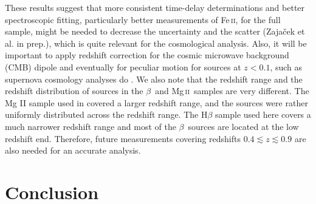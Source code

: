 \documentclass[a4paper,fleqn,usenatbib]{mnras}
\newcommand{\Feii}{Fe\,\textsc{ii}}
\newcommand{\Mgii}{Mg\,\textsc{ii}}
\newcommand{\hb}{{\sc{H}}$\beta$\/}
\begin{document}
These results suggest  that more consistent time-delay determinations and better spectroscopic fitting, particularly better measurements of \Feii, for the full sample, might be needed to decrease the uncertainty and the scatter (Zaja\v{c}ek et al. in prep.), which is quite relevant for the cosmological analysis. Also, it will be important to apply redshift correction for the cosmic microwave background (CMB) dipole and eventually for peculiar motion for sources at $z<0.1$, such as supernova cosmology analyses do \citep[e.g.][and references therein]{davis2011}. We also note that the redshift range and the redshift distribution of sources in the \hb\ and \Mgii\ samples are very different. The Mg II sample used in \citet{khadka2021} covered a larger redshift range, and the sources were rather uniformly distributed across the redshift range. The H$\beta$ sample used here covers a much narrower redshift range and most of the \hb\ sources are located at the low redshift end. Therefore, future measurements covering redshifts $0.4\lesssim z \lesssim 0.9$ are also needed for an accurate analysis.



\section{Conclusion}
\label{con}
\end{document}
